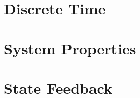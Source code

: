 \documentclass[numerate]{cheatsheet}
\author{Noa Sendlhofer - nsendlhofer@ethz.ch}
\begin{document}
\section{Discrete Time}
	
	
	
\section{System Properties}
	
	
	
	
	
\section{State Feedback}
	
	
\end{document}
